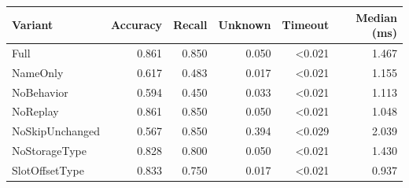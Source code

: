 \begin{tabular}{lrrrrr}
\toprule
Variant & Accuracy & Recall & Unknown & Timeout & Median (ms) \\
\midrule
Full & 0.861 & 0.850 & 0.050 & <0.021 & 1.467 \\
NameOnly & 0.617 & 0.483 & 0.017 & <0.021 & 1.155 \\
NoBehavior & 0.594 & 0.450 & 0.033 & <0.021 & 1.113 \\
NoReplay & 0.861 & 0.850 & 0.050 & <0.021 & 1.048 \\
NoSkipUnchanged & 0.567 & 0.850 & 0.394 & <0.029 & 2.039 \\
NoStorageType & 0.828 & 0.800 & 0.050 & <0.021 & 1.430 \\
SlotOffsetType & 0.833 & 0.750 & 0.017 & <0.021 & 0.937 \\
\bottomrule
\end{tabular}
